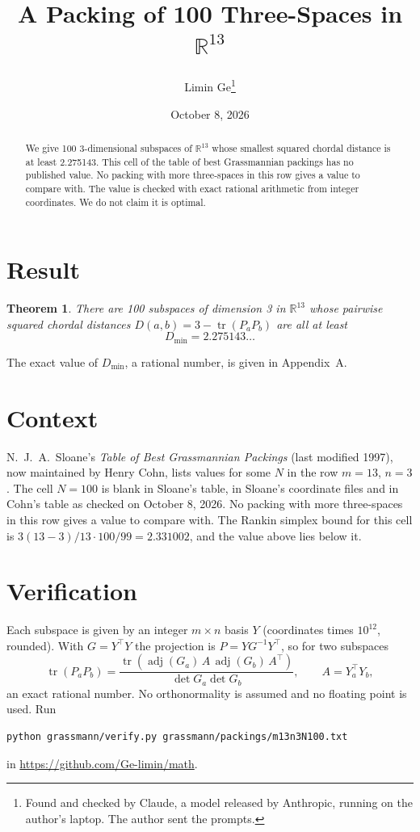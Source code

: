 \documentclass[11pt,a4paper]{article}
\title{A Packing of 100 Three-Spaces in $\mathbb{R}^{13}$}
\author{Limin Ge\thanks{Found and checked by Claude, a model released by Anthropic, running on the author's laptop. The author sent the prompts.}}
\date{October 8, 2026}
\newtheorem*{theorem}{Theorem}
\begin{document}
\maketitle
\begin{abstract}
We give 100 3-dimensional subspaces of $\mathbb{R}^{13}$ whose smallest squared chordal distance is at least 2.275143. This cell of the table of best Grassmannian packings has no published value. No packing with more three-spaces in this row gives a value to compare with. The value is checked with exact rational arithmetic from integer coordinates. We do not claim it is optimal.
\end{abstract}

\section{Result}
\begin{theorem}
There are 100 subspaces of dimension 3 in $\mathbb{R}^{13}$ whose pairwise squared chordal distances $D(a,b) = 3 - \operatorname{tr}(P_aP_b)$ are all at least
\[ D_{\min} = 2.275143\ldots \]
\end{theorem}
The exact value of $D_{\min}$, a rational number, is given in Appendix~A.


\section{Context}
N.~J.~A.~Sloane's \emph{Table of Best Grassmannian Packings} (last modified 1997), now maintained by Henry Cohn, lists values for some $N$ in the row $m=13$, $n=3$. The cell $N=100$ is blank in Sloane's table, in Sloane's coordinate files and in Cohn's table as checked on October 8, 2026. No packing with more three-spaces in this row gives a value to compare with. The Rankin simplex bound for this cell is $3(13-3)/13\cdot 100/99 = 2.331002$, and the value above lies below it.


\section{Verification}
Each subspace is given by an integer $m\times n$ basis $Y$ (coordinates times $10^{12}$, rounded). With $G=Y^\top Y$ the projection is $P=YG^{-1}Y^\top$, so for two subspaces
\[ \operatorname{tr}(P_aP_b)=\frac{\operatorname{tr}(\operatorname{adj}(G_a)\,A\,\operatorname{adj}(G_b)\,A^\top)}{\det G_a\det G_b},\qquad A=Y_a^\top Y_b, \]
an exact rational number. No orthonormality is assumed and no floating point is used. Run
\begin{verbatim}
python grassmann/verify.py grassmann/packings/m13n3N100.txt
\end{verbatim}
in \url{https://github.com/Ge-limin/math}.
\end{document}
